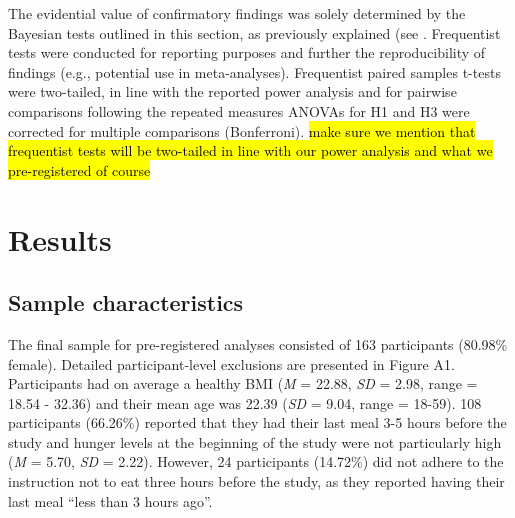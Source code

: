\documentclass[man,floatsintext]{apa6}
\begin{document}
The evidential value of confirmatory findings was solely determined by
the Bayesian tests outlined in this section, as previously explained
(see \textit{}. Frequentist tests were conducted
for reporting purposes and further the reproducibility of findings
(e.g., potential use in meta-analyses). Frequentist paired samples
t-tests were two-tailed, in line with the reported power analysis and
for pairwise comparisons following the repeated measures ANOVAs for H1
and H3 were corrected for multiple comparisons (Bonferroni).
\hl{make sure we mention that frequentist tests will be two-tailed in line with our power analysis and what we pre-registered of course}

\section{Results}\label{results}

\subsection{Sample characteristics}\label{sample-characteristics}

The final sample for pre-registered analyses consisted of 163
participants (80.98\% female). Detailed participant-level exclusions are
presented in Figure A1. Participants had on average a healthy BMI
(\emph{M} = 22.88, \emph{SD} = 2.98, range = 18.54 - 32.36) and their
mean age was 22.39 (\emph{SD} = 9.04, range = 18-59). 108 participants
(66.26\%) reported that they had their last meal 3-5 hours before the
study and hunger levels at the beginning of the study were not
particularly high (\emph{M} = 5.70, \emph{SD} = 2.22). However, 24
participants (14.72\%) did not adhere to the instruction not to eat
three hours before the study, as they reported having their last meal
\enquote{less than 3 hours ago}.
\end{document}
